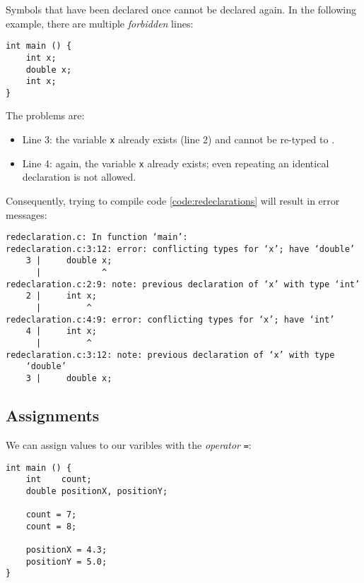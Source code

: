 \begin{warnbox}
Symbols that have been declared once cannot be declared again. In the following example, there are multiple \emph{forbidden} lines:
\begin{codebox}[redeclaration.c]
\begin{verbatim}
int main () {
    int x;
    double x;
    int x;
}
\end{verbatim}
 \label{code:redeclarations}
\end{codebox}
The problems are:
\begin{itemize}
\item Line 3: the variable \texttt{x} already exists (line 2) and cannot be re-typed to .
\item Line 4: again, the variable \texttt{x} already exists; even repeating an identical declaration is not allowed.
\end{itemize}

Consequently, trying to compile code \ref{code:redeclarations} will result in error messages:
\begin{cmdbox}
\begin{verbatim}
redeclaration.c: In function ‘main’:
redeclaration.c:3:12: error: conflicting types for ‘x’; have ‘double’
    3 |     double x;
      |            ^
redeclaration.c:2:9: note: previous declaration of ‘x’ with type ‘int’
    2 |     int x;
      |         ^
redeclaration.c:4:9: error: conflicting types for ‘x’; have ‘int’
    4 |     int x;
      |         ^
redeclaration.c:3:12: note: previous declaration of ‘x’ with type
    ‘double’
    3 |     double x;
\end{verbatim}
\end{cmdbox}
\end{warnbox}

\newpage
\subsection{Assignments} \label{sec:valueAssignment}
We can assign values to our varibles with the \emph{operator} \texttt{=}:
\begin{codebox}[assignments.c]
\begin{verbatim}
int main () {
    int    count;
    double positionX, positionY;

    count = 7;
    count = 8;

    positionX = 4.3;
    positionY = 5.0;
}
\end{verbatim}
 \label{code:simpleAssignment}
\end{codebox}

